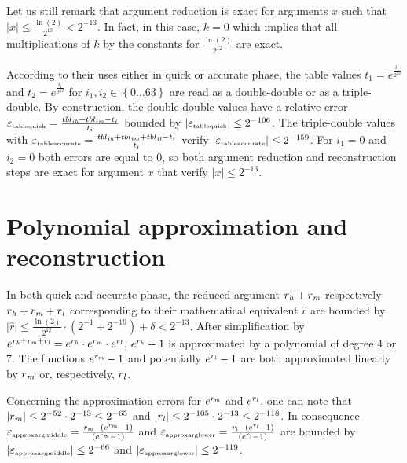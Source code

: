 Let us still remark that argument reduction is exact for arguments $x$
such that $\left \vert x \right \vert \leq \frac{\ln\left( 2
\right)}{2^{13}} < 2^{-13}$. In fact, in this case, $k = 0$ which
implies that all multiplications of $k$ by the constants for
$\frac{\ln\left( 2 \right)}{2^{12}}$ are exact. 

According to their uses either in quick or accurate phase, the table
values $t_1 = e^{\frac{i_1}{2^{12}}}$ and $t_2 =
e^{\frac{i_1}{2^{12}}}$ for $i_1, i_2 \in \left \lbrace 0 \dots 63
\right \rbrace$ are read as a double-double or as a triple-double. By
construction, the double-double values have a relative error
$\epsilon_{\mbox{\tiny tablequick}} = \frac{tbl_{i\hi} + tbl_{i\mi} -
t_i}{t_i}$ bounded by $\left \vert \epsilon_{\mbox{\tiny tablequick}}
\right \vert \leq 2^{-106}$.  The triple-double values with
$\epsilon_{\mbox{\tiny tableaccurate}} = \frac{tbl_{i\hi} + tbl_{i\mi}
+ tbl_{i\lo} - t_i}{t_i}$ verify $\left \vert \epsilon_{\mbox{\tiny
tableaccurate}} \right \vert \leq 2^{-159}$. For $i_1 = 0$ and $i_2 =
0$ both errors are equal to $0$, so both argument reduction and
reconstruction steps are exact for argument $x$ that verify $\left
\vert x \right \vert \leq 2^{-13}$.

\section{Polynomial approximation and reconstruction}\label{sec:exppolynomial}
In both quick and accurate phase, the reduced argument $r_\hi + r_\mi$
respectively $r_\hi + r_\mi + r_\lo$ corresponding to their
mathematical equivalent $\hat{r}$ are bounded by $\left \vert \hat{r}
\right \vert \leq \frac{\ln\left( 2 \right)}{2^{12}} \cdot \left(
2^{-1} + 2^{-19} \right) + \delta < 2^{-13}$.  After simplification by
$e^{r_\hi + r_\mi + r_\lo} = e^{r_\hi} \cdot e^{r_\mi} \cdot
e^{r_\lo}$, $e^{r_\hi} - 1$ is approximated by a polynomial of degree
4 or 7. The functions $e^{r_\mi} - 1$ and potentially $e^{r_\lo} - 1$
are both approximated linearly by $r_\mi$ or, respectively, $r_\lo$.

Concerning the approximation errors for $e^{r_\mi}$ and $e^{r_\lo}$,
one can note that $\left \vert r_\mi \right \vert \leq 2^{-52} \cdot
2^{-13} \leq 2^{-65}$ and $\left \vert r_\lo \right \vert \leq
2^{-105} \cdot 2^{-13} \leq 2^{-118}$. In consequence
$\epsilon_{\mbox{\tiny approxargmiddle}} = \frac{r_\mi - \left(
e^{r_\mi} - 1 \right)}{\left( e^{r_\mi} - 1 \right)}$ and
$\epsilon_{\mbox{\tiny approxarglower}} = \frac{r_\lo - \left(
e^{r_\lo} - 1 \right)}{\left( e^{r_\lo} - 1 \right)}$ are bounded by
$\left \vert \epsilon_{\mbox{\tiny approxargmiddle}} \right \vert \leq
2^{-66}$ and $\left \vert \epsilon_{\mbox{\tiny approxarglower}}
\right \vert \leq 2^{-119}$.


